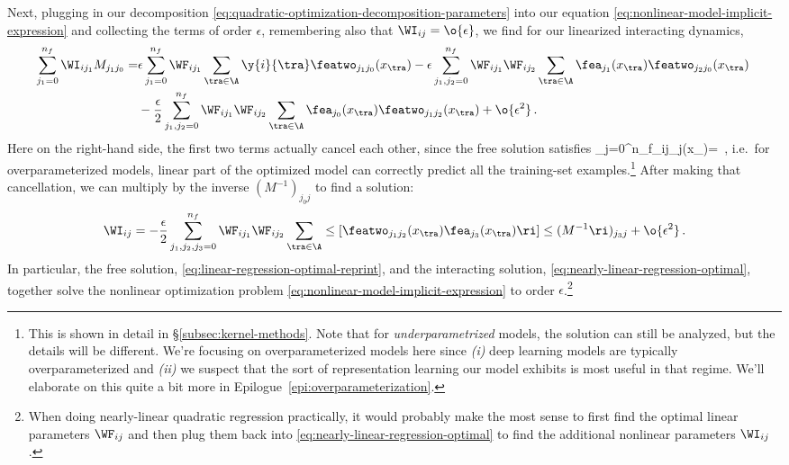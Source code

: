 Next, plugging in our decomposition \eqref{eq:quadratic-optimization-decomposition-parameters} into our equation \eqref{eq:nonlinear-model-implicit-expression} and collecting the terms of order $\epsilon$, remembering also that $\WI_{ij}=\o{\epsilon}$, we find for our linearized interacting dynamics,
\begin{align}
\sum_{j_1=0}^{n_f}\WI_{ij_1}M_{j_1j_0}=&\epsilon\sum_{j_1=0}^{n_f}\WF_{ij_1}\sum_{\tra\in\A}\y{i}{\tra}\featwo_{j_1j_0}(x_{\tra})-\epsilon\sum_{j_1,j_2=0}^{n_f}\WF_{ij_1}\WF_{ij_2}\sum_{\tra\in\A}\fea_{j_1}(x_{\tra})\featwo_{j_2j_0}(x_{\tra})\, \notag\\
&-\frac{\epsilon}{2}\sum_{j_1,j_2=0}^{n_f}\WF_{ij_1}\WF_{ij_2}\sum_{\tra\in\A}\fea_{j_0}(x_{\tra})\featwo_{j_1j_2}(x_{\tra}) +\o{\epsilon^2}\, .
\end{align}
Here on the right-hand side, the first two terms actually cancel each other, since the free solution satisfies
\be\label{eq:one-nice-property-of-free-solution}
\sum_{j=0}^{n_f}\WF_{ij}\fea_{j}(x_{\tra})=\, ,
\ee
i.e.~for overparameterized models, linear part of the optimized model can correctly predict all the training-set examples.\footnote{This is shown in detail in \S\ref{subsec:kernel-methods}. Note that for \emph{underparametrized} models, the solution can still be analyzed, but the details will be different. We're focusing on overparameterized models here since \emph{(i)} deep learning models are typically overparameterized and \emph{(ii)} we suspect that the sort of representation learning our model exhibits is most useful in that regime.
We'll elaborate on this quite a bit more in Epilogue~\ref{epi:overparameterization}.
}
After making that cancellation, we can multiply by the inverse $(M^{-1})_{j_0 j}$ to find a solution:
\begin{align}\label{eq:nearly-linear-regression-optimal}
\WI_{ij}=-\frac{\epsilon}{2}\sum_{j_1,j_2,j_3=0}^{n_f}\WF_{ij_1}\WF_{ij_2}\sum_{\tra\in\A}\le[\featwo_{j_1j_2}(x_{\tra})\fea_{j_3}(x_{\tra})\ri]\le(M^{-1}\ri)_{j_3j}+\o{\epsilon^2}\, .
\end{align}
In particular, the free solution, \eqref{eq:linear-regression-optimal-reprint}, and the interacting solution, \eqref{eq:nearly-linear-regression-optimal}, together solve the nonlinear optimization problem \eqref{eq:nonlinear-model-implicit-expression} to order $\epsilon$.\footnote{When doing nearly-linear quadratic regression practically, it would probably make the most sense to first find the optimal linear parameters $\WF_{ij}$ and then plug them back into \eqref{eq:nearly-linear-regression-optimal} to find the additional nonlinear parameters $\WI_{ij}$.}




